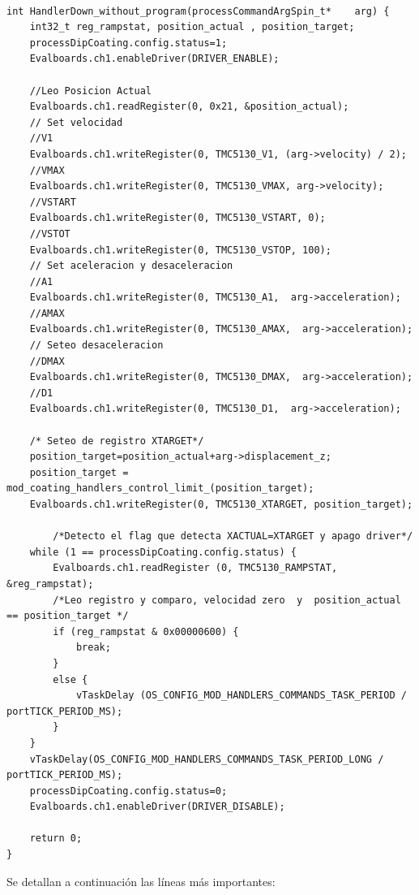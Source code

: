 \begin{lstlisting}[label=code:vDownCode,caption=Ejecución de comando DOWN.] % 

int HandlerDown_without_program(processCommandArgSpin_t*	arg) {
	int32_t reg_rampstat, position_actual , position_target;
	processDipCoating.config.status=1;
	Evalboards.ch1.enableDriver(DRIVER_ENABLE);

	//Leo Posicion Actual
	Evalboards.ch1.readRegister(0, 0x21, &position_actual);
	// Set velocidad
	//V1
	Evalboards.ch1.writeRegister(0, TMC5130_V1, (arg->velocity) / 2);
	//VMAX
	Evalboards.ch1.writeRegister(0, TMC5130_VMAX, arg->velocity);
	//VSTART
	Evalboards.ch1.writeRegister(0, TMC5130_VSTART, 0);
	//VSTOT
	Evalboards.ch1.writeRegister(0, TMC5130_VSTOP, 100);
	// Set aceleracion y desaceleracion
	//A1
	Evalboards.ch1.writeRegister(0, TMC5130_A1,  arg->acceleration);
	//AMAX
	Evalboards.ch1.writeRegister(0, TMC5130_AMAX,  arg->acceleration);
	// Seteo desaceleracion
	//DMAX
	Evalboards.ch1.writeRegister(0, TMC5130_DMAX,  arg->acceleration);
	//D1
	Evalboards.ch1.writeRegister(0, TMC5130_D1,  arg->acceleration);

	/* Seteo de registro XTARGET*/
	position_target=position_actual+arg->displacement_z;
	position_target = mod_coating_handlers_control_limit_(position_target);
	Evalboards.ch1.writeRegister(0, TMC5130_XTARGET, position_target);

		/*Detecto el flag que detecta XACTUAL=XTARGET y apago driver*/
	while (1 == processDipCoating.config.status) {
		Evalboards.ch1.readRegister (0, TMC5130_RAMPSTAT, &reg_rampstat);
		/*Leo registro y comparo, velocidad zero  y  position_actual == position_target */
		if (reg_rampstat & 0x00000600) {
			break;
		}
		else {
			vTaskDelay (OS_CONFIG_MOD_HANDLERS_COMMANDS_TASK_PERIOD / portTICK_PERIOD_MS);
		}
	}
	vTaskDelay(OS_CONFIG_MOD_HANDLERS_COMMANDS_TASK_PERIOD_LONG / portTICK_PERIOD_MS);
	processDipCoating.config.status=0;
	Evalboards.ch1.enableDriver(DRIVER_DISABLE);

	return 0;
}
\end{lstlisting}

Se detallan a continuación las líneas más importantes:

